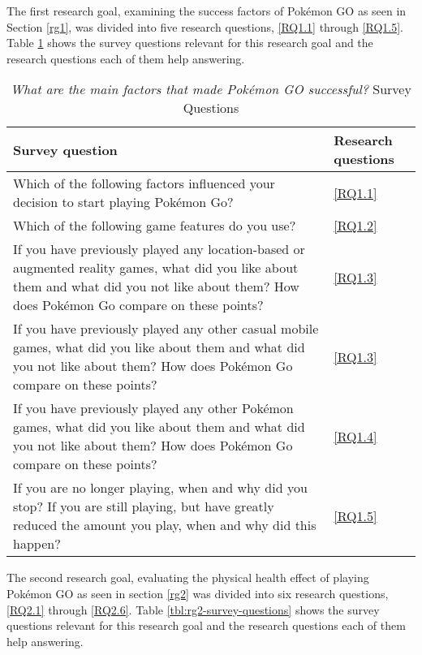 
The first research goal, examining the success factors of Pokémon GO as seen in Section \ref{rg1}, was divided into five research questions, \ref{RQ1.1} through \ref{RQ1.5}. Table \ref{tbl:rg1-survey-questions} shows the survey questions relevant for this research goal and the research questions each of them help answering.

\begin{table}[h]
	\caption{\emph{What are the main factors that made Pokémon GO successful?} Survey Questions}
	\centering
	\label{tbl:rg1-survey-questions}
	\begin{tabularx}{\textwidth}{|X|l|}
		\hline
		\textbf{Survey question} & \textbf{Research questions}\\
		\hline\hline
		
		Which of the following factors influenced your decision to start playing Pokémon Go? & \ref{RQ1.1}\\
		\hline
		
		Which of the following game features do you use? & \ref{RQ1.2}\\
		\hline
		
		If you have previously played any location-based or augmented reality games, what did you like about them and what did you not like about them? How does Pokémon Go compare on these points? & \ref{RQ1.3}\\
		\hline
		
		If you have previously played any other casual mobile games, what did you like about them and what did you not like about them? How does Pokémon Go compare on these points? & \ref{RQ1.3}\\
		\hline
		
		If you have previously played any other Pokémon games, what did you like about them and what did you not like about them? How does Pokémon Go compare on these points? & \ref{RQ1.4}\\
		\hline
		
		If you are no longer playing, when and why did you stop? If you are still playing, but have greatly reduced the amount you play, when and why did this happen? & \ref{RQ1.5}\\
		\hline
	\end{tabularx}
\end{table}

The second research goal, evaluating the physical health effect of playing Pokémon GO as seen in section \ref{rg2} was divided into six research questions, \ref{RQ2.1} through \ref{RQ2.6}. Table \ref{tbl:rg2-survey-questions} shows the survey questions relevant for this research goal and the research questions each of them help answering.

